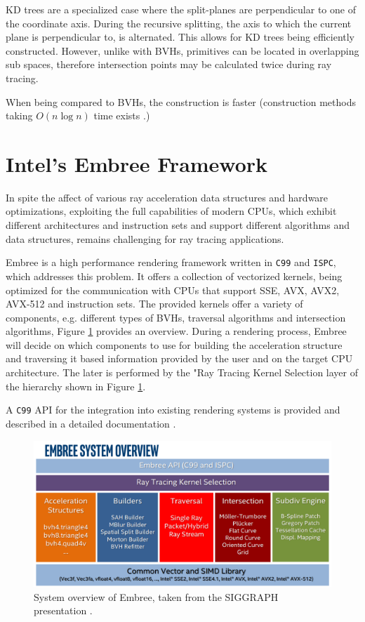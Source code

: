 KD trees are a specialized case where the split-planes are perpendicular to one of the coordinate axis. During the recursive splitting, the axis to which the current plane is perpendicular to, is alternated. This allows for KD trees being efficiently constructed. However,  unlike with BVHs, primitives can be located in overlapping sub spaces, therefore intersection points may be calculated twice during ray tracing. 

When being compared to BVHs, the construction is faster (construction methods taking $O(n\log n)$ time exists \cite{wald2001interactive}.)

\section{Intel\textregistered's Embree Framework}
In spite the affect of various ray acceleration data structures and hardware optimizations, exploiting the full capabilities of modern CPUs, which exhibit different architectures and instruction sets and support different algorithms and data structures, remains challenging for ray tracing applications. 

Embree is a high performance rendering framework written in \texttt{C99} and \texttt{ISPC}, which addresses this problem. It offers a collection of vectorized kernels, being optimized for the communication with CPUs that support SSE, AVX, AVX2, AVX-512 and instruction sets. The provided kernels offer a variety of components, e.g. different types of BVHs, traversal algorithms and intersection algorithms, Figure \ref{fig:embree} provides an overview.
During a rendering process, Embree will decide on which components to use for building the acceleration structure and traversing it based information provided by the user and on the target CPU architecture. The later is performed by the "Ray Tracing Kernel Selection layer of the hierarchy shown in Figure \ref{fig:embree}.

A \texttt{C99} API for the integration into existing rendering systems is provided and described in a detailed documentation \cite{embree2021Doc}. 

\begin{figure}
	\centering
	\includegraphics[width=1\linewidth]{img/1 fundamentals/embree_overview.png}
	\caption{System overview of Embree, taken from the SIGGRAPH presentation  \cite{embreeSlides}.}
	\label{fig:embree}
\end{figure}

